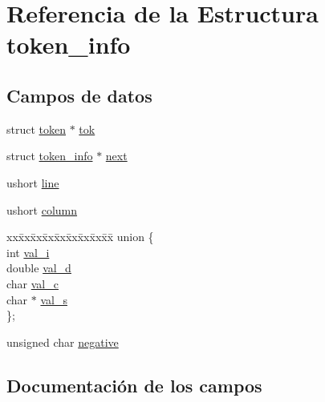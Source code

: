 \hypertarget{structtoken__info}{}\section{Referencia de la Estructura token\+\_\+info}
\label{structtoken__info}
\subsection*{Campos de datos}
\begin{DoxyCompactItemize}
\item 
struct \mbox{\hyperlink{structtoken}{token}} $\ast$ \mbox{\hyperlink{structtoken__info_a55f2da03def99d2cd8adb1f2d5cb1eb9}{tok}}
\item 
struct \mbox{\hyperlink{structtoken__info}{token\+\_\+info}} $\ast$ \mbox{\hyperlink{structtoken__info_a8ae533e40ed837711592f2ccd0fbdaa7}{next}}
\item 
ushort \mbox{\hyperlink{structtoken__info_a9f183ebb8ba45891c72626828d03d2f9}{line}}
\item 
ushort \mbox{\hyperlink{structtoken__info_a92e8a6381043a4d7a36414f2e86a5e7f}{column}}
\item 
\begin{tabbing}
xx\=xx\=xx\=xx\=xx\=xx\=xx\=xx\=xx\=\kill
union \{\\
\>int \mbox{\hyperlink{structtoken__info_a5aca99878d252001e7155853bef92c02}{val\_i}}\\
\>double \mbox{\hyperlink{structtoken__info_aec49de79a01a725b253eaeceb7e6b22c}{val\_d}}\\
\>char \mbox{\hyperlink{structtoken__info_a0928ec52e0db63dd228e929167c777cd}{val\_c}}\\
\>char $\ast$ \mbox{\hyperlink{structtoken__info_aa00629ea53975a7720bbe8c50637ce1c}{val\_s}}\\
\}; \\

\end{tabbing}\item 
unsigned char \mbox{\hyperlink{structtoken__info_aaf4c2889c4560c02792fa4cf4b0fe522}{negative}}
\end{DoxyCompactItemize}


\subsection{Documentación de los campos}
\mbox{\label{structtoken__info_a4b9d7d7970bf4f34c6e44b1e86218f27}} 
